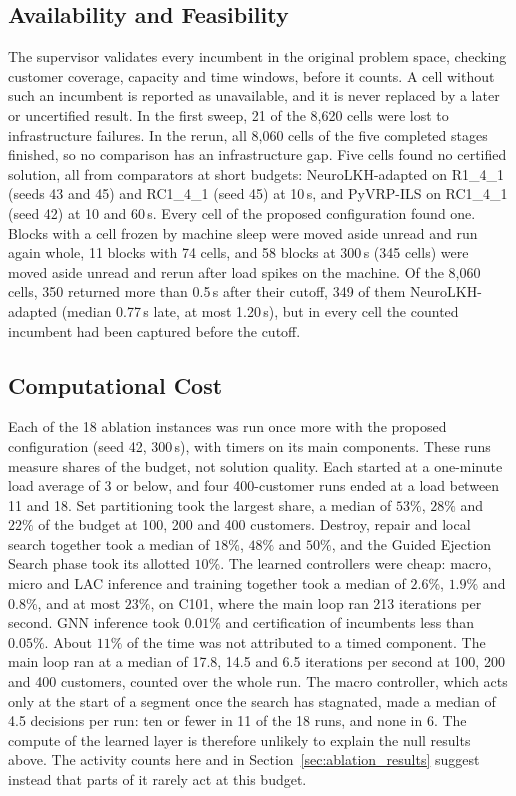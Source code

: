 \documentclass{ieeeaccess}
\begin{document}
\subsection{Availability and Feasibility}
\label{sec:feasibility_results}
The supervisor validates every incumbent in the original problem space, checking customer coverage, capacity and time windows, before it counts. A cell without such an incumbent is reported as unavailable, and it is never replaced by a later or uncertified result. In the first sweep, 21 of the 8,620 cells were lost to infrastructure failures. In the rerun, all 8,060 cells of the five completed stages finished, so no comparison has an infrastructure gap. Five cells found no certified solution, all from comparators at short budgets: NeuroLKH-adapted on R1\_4\_1 (seeds 43 and 45) and RC1\_4\_1 (seed 45) at 10\,s, and PyVRP-ILS on RC1\_4\_1 (seed 42) at 10 and 60\,s. Every cell of the proposed configuration found one. Blocks with a cell frozen by machine sleep were moved aside unread and run again whole, 11 blocks with 74 cells, and 58 blocks at 300\,s (345 cells) were moved aside unread and rerun after load spikes on the machine. Of the 8,060 cells, 350 returned more than 0.5\,s after their cutoff, 349 of them NeuroLKH-adapted (median 0.77\,s late, at most 1.20\,s), but in every cell the counted incumbent had been captured before the cutoff.

\subsection{Computational Cost}
\label{sec:cost_results}
Each of the 18 ablation instances was run once more with the proposed configuration (seed 42, 300\,s), with timers on its main components. These runs measure shares of the budget, not solution quality. Each started at a one-minute load average of 3 or below, and four 400-customer runs ended at a load between 11 and 18. Set partitioning took the largest share, a median of $53\%$, $28\%$ and $22\%$ of the budget at 100, 200 and 400 customers. Destroy, repair and local search together took a median of $18\%$, $48\%$ and $50\%$, and the Guided Ejection Search phase took its allotted $10\%$. The learned controllers were cheap: macro, micro and LAC inference and training together took a median of $2.6\%$, $1.9\%$ and $0.8\%$, and at most $23\%$, on C101, where the main loop ran 213 iterations per second. GNN inference took $0.01\%$ and certification of incumbents less than $0.05\%$. About $11\%$ of the time was not attributed to a timed component. The main loop ran at a median of 17.8, 14.5 and 6.5 iterations per second at 100, 200 and 400 customers, counted over the whole run. The macro controller, which acts only at the start of a segment once the search has stagnated, made a median of 4.5 decisions per run: ten or fewer in 11 of the 18 runs, and none in 6. The compute of the learned layer is therefore unlikely to explain the null results above. The activity counts here and in Section~\ref{sec:ablation_results} suggest instead that parts of it rarely act at this budget.
\end{document}
